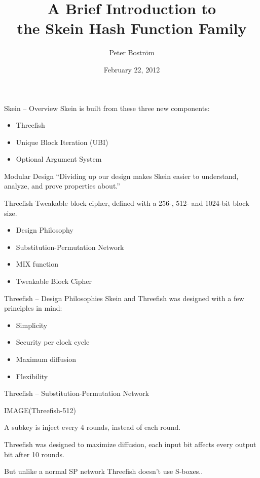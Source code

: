 \documentclass{beamer}
\title[The Skein Hash Function Family]{A Brief Introduction to\\the Skein Hash Function Family}
\author{Peter Boström}
\institute{Royal Institute of Technology (RIOT)}
\date{February 22, 2012}
\begin{document}
\begin{frame}
	\titlepage
\end{frame}

\begin{frame}{Skein -- Overview}
	Skein is built from these three new components:
	\vspace{4mm}
	\begin{itemize}
		\item Threefish
		\item Unique Block Iteration (UBI)
		\item Optional Argument System
	\end{itemize}
	\vspace{12mm}
	\begin{block}{Modular Design}
		``Dividing up our design makes Skein easier to understand, analyze, and prove properties about.''
	\end{block}
\end{frame}

\begin{frame}{Threefish}
	Tweakable block cipher, defined with a 256-, 512- and 1024-bit block size.
	\vspace{2mm}
	\begin{itemize}
		\item Design Philosophy
		\item Substitution-Permutation Network
		\item MIX function
		\item Tweakable Block Cipher
	\end{itemize}
\end{frame}

\begin{frame}{Threefish -- Design Philosophies}
	Skein and Threefish was designed with a few principles in mind:
	\vspace{2mm}
	\begin{itemize}
		\item Simplicity
		\item Security per clock cycle
		\item Maximum diffusion
		\item Flexibility
	\end{itemize}
\end{frame}

\begin{frame}{Threefish -- Substitution-Permutation Network}

	IMAGE(Threefish-512)\vspace{8mm}

	A subkey is inject every 4 rounds, instead of each round.

	\vspace{2mm}
	Threefish was designed to maximize diffusion, each input bit affects every output bit after 10 rounds.

	\vspace{2mm}
	But unlike a normal SP network Threefish doesn't use S-boxes..

\end{frame}
\end{document}
